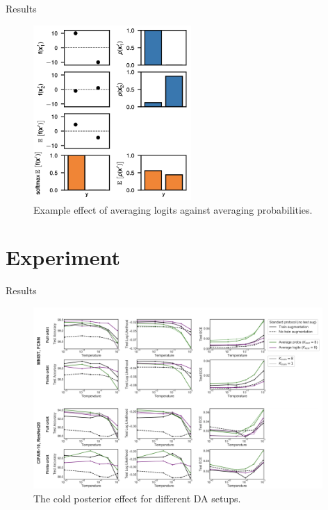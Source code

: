 \documentclass[10pt, handout, envcountsect]{beamer} %
\begin{document}
\begin{frame}{Results}

\begin{figure}[h]
    \centering
    \includegraphics[width=6cm,]{figure3.png}
    \caption{Example effect of averaging logits against averaging probabilities. 
    }
\end{figure}


    
\end{frame}





\section{Experiment}
\begin{frame}{Results}

\begin{figure}[h]
    \centering
    \includegraphics[width=11cm,]{figure4.png}
    \caption{The cold posterior effect for different DA setups.}
\end{figure}


    
\end{frame}
\end{document}
